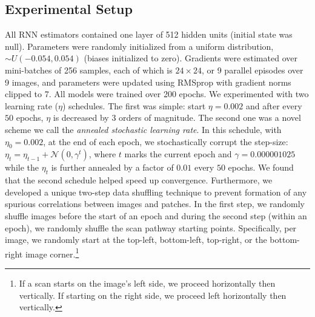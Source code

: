 \documentclass[smallabstract,smallcaptions]{dccpaper}
\begin{document}
\subsection{Experimental Setup}
\label{exp:design}
All RNN estimators contained one layer of 512 hidden units (initial state was null). Parameters were randomly initialized from a uniform distribution, $\sim U(-0.054, 0.054)$ (biases initialized to zero). Gradients were estimated over mini-batches of 256 samples, each of which is $24 \times 24$, or 9 parallel episodes over 9 images, and parameters were updated using RMSprop {\cite{Tieleman2012}} with gradient norms clipped to 7. All models were trained over 200 epochs. We experimented with two learning rate ($\eta$) schedules. The first was simple: start $\eta = 0.002$ and after every $50$ epochs, $\eta$ is decreased by $3$ orders of magnitude.
The second one was a novel scheme we call the \emph{annealed stochastic learning rate}. In this schedule, with $\eta_0 = 0.002$, at the end of each epoch, we stochastically corrupt the step-size: $\eta_t  = \eta_{t-1} + \mathcal{N}(0,\gamma^{t})$, where $t$ marks the current epoch and $\gamma = 0.000001025$ while the $\eta_t$ is further annealed by a factor of $0.01$ every $50$ epochs. We found that the second schedule helped speed up convergence. Furthermore, we developed a unique two-step data shuffling technique to prevent formation of any spurious correlations between images and patches. In the first step, we randomly shuffle images before the start of an epoch and during the second step (within an epoch), we randomly shuffle the scan pathway starting points. Specifically, per image, we randomly start at the top-left, bottom-left, top-right, or the bottom-right image corner.\footnote{If a scan starts on the image's left side, we proceed horizontally then vertically. If starting on the right side, we proceed left horizontally then vertically.}   %


\end{document}
